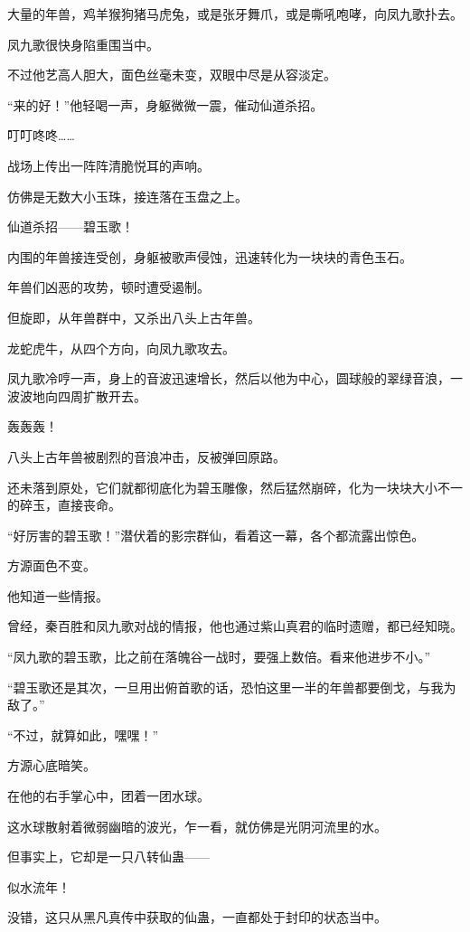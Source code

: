 
\begin{this_body}

大量的年兽，鸡羊猴狗猪马虎兔，或是张牙舞爪，或是嘶吼咆哮，向凤九歌扑去。

凤九歌很快身陷重围当中。

不过他艺高人胆大，面色丝毫未变，双眼中尽是从容淡定。

“来的好！”他轻喝一声，身躯微微一震，催动仙道杀招。

叮叮咚咚……

战场上传出一阵阵清脆悦耳的声响。

仿佛是无数大小玉珠，接连落在玉盘之上。

仙道杀招——碧玉歌！

内围的年兽接连受创，身躯被歌声侵蚀，迅速转化为一块块的青色玉石。

年兽们凶恶的攻势，顿时遭受遏制。

但旋即，从年兽群中，又杀出八头上古年兽。

龙蛇虎牛，从四个方向，向凤九歌攻去。

凤九歌冷哼一声，身上的音波迅速增长，然后以他为中心，圆球般的翠绿音浪，一波波地向四周扩散开去。

轰轰轰！

八头上古年兽被剧烈的音浪冲击，反被弹回原路。

还未落到原处，它们就都彻底化为碧玉雕像，然后猛然崩碎，化为一块块大小不一的碎玉，直接丧命。

“好厉害的碧玉歌！”潜伏着的影宗群仙，看着这一幕，各个都流露出惊色。

方源面色不变。

他知道一些情报。

曾经，秦百胜和凤九歌对战的情报，他也通过紫山真君的临时遗赠，都已经知晓。

“凤九歌的碧玉歌，比之前在落魄谷一战时，要强上数倍。看来他进步不小。”

“碧玉歌还是其次，一旦用出俯首歌的话，恐怕这里一半的年兽都要倒戈，与我为敌了。”

“不过，就算如此，嘿嘿！”

方源心底暗笑。

在他的右手掌心中，团着一团水球。

这水球散射着微弱幽暗的波光，乍一看，就仿佛是光阴河流里的水。

但事实上，它却是一只八转仙蛊——

似水流年！

没错，这只从黑凡真传中获取的仙蛊，一直都处于封印的状态当中。


\end{this_body}
